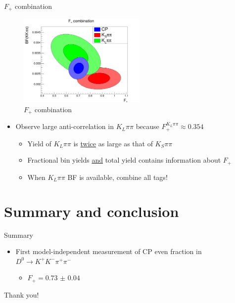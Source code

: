 \documentclass{beamer}
\begin{document}
\begin{frame}{$F_+$ combination}
  \begin{figure}
    \includegraphics[width = 0.55\textwidth]{Plots/FPlus_contours.png}
    \caption{$F_+$ combination}
  \end{figure}
  \vspace{-0.6cm}
  \begin{itemize}
    \item{Observe large anti-correlation in $K_L\pi\pi$ because $F^{K_L\pi\pi}_+\approx 0.354$}
    \begin{itemize}
      \item{Yield of $K_L\pi\pi$ is \underline{twice} as large as that of $K_S\pi\pi$}
      \item{Fractional bin yields \underline{and} total yield contains information about $F_+$}
      \item{When $K_L\pi\pi$ BF is available, combine all tags!}
    \end{itemize}
  \end{itemize}
\end{frame}

\section{Summary and conclusion}

\begin{frame}{Summary}
  \begin{itemize}
    \setlength\itemsep{1.0em}
    \item{First model-independent measurement of CP even fraction in $D^0\to K^+K^-\pi^+\pi^-$}
    \begin{itemize}
      \item{$F_+ = \SI{0.73(4)}{}$}
    \end{itemize}
  \end{itemize}
  \begin{center}
    {\huge Thank you!}
  \end{center}
\end{frame}
\end{document}
